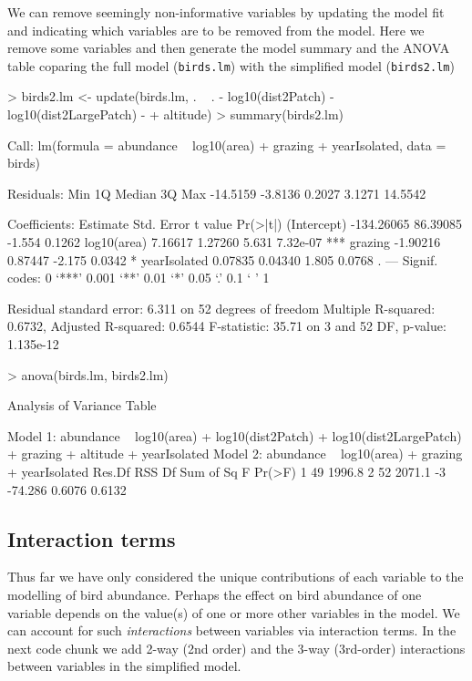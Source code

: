 \documentclass[letterpaper,10pt]{article}
\begin{document}
We can remove seemingly non-informative variables by updating the model fit and indicating which variables are to be removed from the model. Here we remove some variables and then generate the model summary and the ANOVA table coparing the full model (\texttt{birds.lm}) with the simplified model (\texttt{birds2.lm})

\begin{Schunk}
\begin{Sinput}
> birds2.lm <- update(birds.lm, . ~ . - log10(dist2Patch) - log10(dist2LargePatch) -
+                     altitude)
> summary(birds2.lm)
\end{Sinput}
\begin{Soutput}
Call:
lm(formula = abundance ~ log10(area) + grazing + yearIsolated, 
    data = birds)

Residuals:
     Min       1Q   Median       3Q      Max 
-14.5159  -3.8136   0.2027   3.1271  14.5542 

Coefficients:
               Estimate Std. Error t value Pr(>|t|)    
(Intercept)  -134.26065   86.39085  -1.554   0.1262    
log10(area)     7.16617    1.27260   5.631 7.32e-07 ***
grazing        -1.90216    0.87447  -2.175   0.0342 *  
yearIsolated    0.07835    0.04340   1.805   0.0768 .  
---
Signif. codes:  0 ‘***’ 0.001 ‘**’ 0.01 ‘*’ 0.05 ‘.’ 0.1 ‘ ’ 1

Residual standard error: 6.311 on 52 degrees of freedom
Multiple R-squared:  0.6732,	Adjusted R-squared:  0.6544 
F-statistic: 35.71 on 3 and 52 DF,  p-value: 1.135e-12
\end{Soutput}
\begin{Sinput}
> anova(birds.lm, birds2.lm)
\end{Sinput}
\begin{Soutput}
Analysis of Variance Table

Model 1: abundance ~ log10(area) + log10(dist2Patch) + log10(dist2LargePatch) + 
    grazing + altitude + yearIsolated
Model 2: abundance ~ log10(area) + grazing + yearIsolated
  Res.Df    RSS Df Sum of Sq      F Pr(>F)
1     49 1996.8                           
2     52 2071.1 -3   -74.286 0.6076 0.6132
\end{Soutput}
\end{Schunk}

\subsection{Interaction terms}
Thus far we have only considered the unique contributions of each variable to the modelling of bird abundance. Perhaps the effect on bird abundance of one variable depends on the value(s) of one or more other variables in the model. We can account for such \textit{interactions} between variables via interaction terms. In the next code chunk we add 2-way (2nd order) and the 3-way (3rd-order) interactions between variables in the simplified model.
\end{document}
